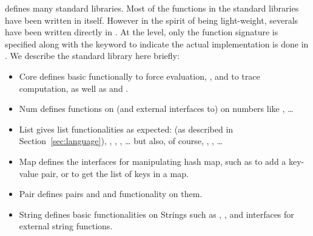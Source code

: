 
\Tosca defines many standard libraries. Most of the functions in the standard
libraries have been written in \Tosca itself. However in the spirit of \Tosca
being light-weight, severals have been written directly in \java. At the \Tosca level, 
only the function signature is specified along with the keyword  to indicate the
actual implementation is done in \java.
We describe the standard library here briefly:
%
\begin{itemize}
\item {} %
              {Core}{} %
              defines basic functionally  to force
              evaluation, , and
               to trace computation, as well as
               and .
\item {} %
              {Num}{} %
              defines functions on (and external interfaces to) on
              numbers like , 
              \ldots
\item {} %
              {List}{} %
              gives list functionalities as expected:
               (as described in
              Section~\ref{sec:language}), ,
              , , \ldots
              but also, of course, ,
              ,  \ldots
\item {} %
              {Map}{} %
              defines the interfaces for manipulating hash map,
              such as  to add a key-value pair,
              or  to get the list of keys in a map. 
\item {} %
              {Pair}{} %
              defines pairs and and functionality on them.
\item {} %
              {String}{} %
              defines basic functionalities on Strings such as
              , , 
              and interfaces for external string functions.
\end{itemize}

